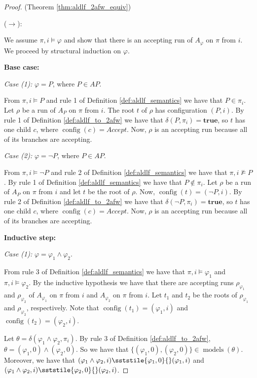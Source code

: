 \documentclass{lmcs}
\theoremstyle{definition}
\newcommand{\sderives}[1]{\sststile{#1}{}}
\DeclareMathOperator{\config}{config}
\DeclareMathOperator{\?}{?}
\DeclareMathOperator{\mymodels}{models}
\begin{document}
\begin{proof} (Theorem \ref{thm:aldlf_2afw_equiv})

    ($\rightarrow$):

    We assume $\pi,i \models \varphi$ and show that there is an accepting run of $A_\varphi$ on $\pi$ from $i$.
    We proceed by structural induction on $\varphi$.

    \textbf{Base case:}

    \textit{Case (1):} $\varphi = P$, where $P \in AP$.

    From $\pi,i \models P$ and rule 1 of Definition \ref{def:aldlf_semantics} we have that $P \in \pi_i$.  Let $\rho$ be
    a run of $A_P$ on $\pi$ from $i$. The root $t$ of $\rho$ has configuration $(P,i)$. By rule 1 of Definition \ref{def:aldlf_to_2afw}
    we have that $\delta(P,\pi_i) = \textbf{true}$, so $t$ has one child $c$, where $\config(c) = Accept$. Now, $\rho$ is an accepting
    run because all of its branches are accepting.

    \textit{Case (2):} $\varphi = \neg P$, where $P \in AP$.

    From $\pi,i \models \neg P$ and rule 2 of Definition \ref{def:aldlf_semantics} we have that $\pi,i \not\models P$. By rule
    1 of Definition \ref{def:aldlf_semantics} we have that $P \not\in \pi_i$. Let $\rho$ be a run of $A_P$ on $\pi$ from $i$ and let
    $t$ be the root of $\rho$. Now, $\config(t) = (\neg P,i)$. By rule 2 of Definition \ref{def:aldlf_to_2afw}
    we have that $\delta(\neg P,\pi_i) = \textbf{true}$, so $t$ has one child $c$, where $\config(c) = Accept$. Now, $\rho$ is an
    accepting run because all of its branches are accepting.

    \textbf{Inductive step:}

    \textit{Case (1):} $\varphi = \varphi_1 \wedge \varphi_2$.

    From rule 3 of Definition \ref{def:aldlf_semantics} we have that
    $\pi,i \models \varphi_1$ and $\pi,i \models \varphi_2$.
    By the inductive hypothesis we have that there are accepting runs $\rho_{\varphi_1}$ and $\rho_{\varphi_2}$ of $A_{\varphi_1}$
    on $\pi$ from $i$
    and $A_{\varphi_2}$ on $\pi$ from $i$. Let $t_1$ and $t_2$ be the roots of $\rho_{\varphi_1}$ and $\rho_{\varphi_2}$, respectively.
    Note that $\config(t_1) = (\varphi_1,i)$ and $\config(t_2) = (\varphi_2,i)$.

    Let $\theta = \delta(\varphi_1 \wedge \varphi_2,\pi_i)$. By rule 3 of Definition \ref{def:aldlf_to_2afw},
    $\theta = (\varphi_1,0) \wedge (\varphi_2,0)$. So we have that
    $\{(\varphi_1,0), (\varphi_2,0)\} \in \mymodels(\theta)$.
    Moreover, we have that $(\varphi_1 \wedge \varphi_2,i) \sderives{\varphi_1,0} (\varphi_1,i)$
    and $(\varphi_1 \wedge \varphi_2,i) \sderives{\varphi_2,0} (\varphi_2,i)$.


\end{proof}
\end{document}
